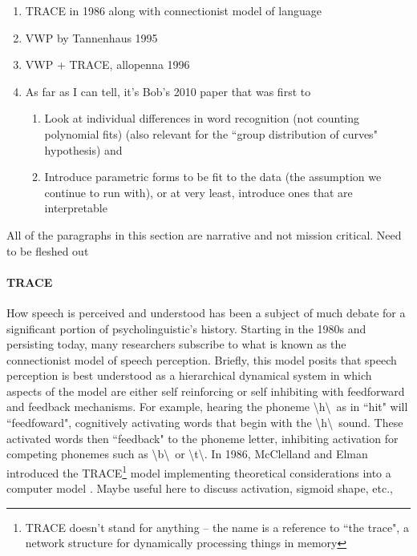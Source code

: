 \documentclass{article}
\begin{document}
\begin{singlespace}
\begin{enumerate}
\vspace{-2mm}
\item TRACE in 1986 along with connectionist model of language
\item VWP by Tannenhaus 1995
\item VWP + TRACE, allopenna 1996
\item As far as I can tell, it's Bob's 2010 paper that was first to 
\begin{enumerate}
\item Look at individual differences in word recognition (not counting polynomial fits) (also relevant for the ``group distribution of curves" hypothesis) and
\item Introduce parametric forms to be fit to the data (the assumption we continue to run with), or at very least, introduce ones that are interpretable
\end{enumerate}
\end{enumerate}
\end{singlespace}

All of the paragraphs in this section are narrative and not mission critical. Need to be fleshed out

\paragraph{TRACE } How speech is perceived and understood has been a subject of much debate for a significant portion of psycholinguistic's history. Starting in the 1980s and persisting today, many researchers subscribe to what is known as the connectionist model of speech perception. Briefly, this model posits that speech perception is best understood as a hierarchical dynamical system in which aspects of the model are either self reinforcing or self inhibiting with feedforward and feedback mechanisms. For example, hearing the phoneme \textbackslash h\textbackslash  \ as in ``hit" will ``feedfoward", cognitively activating words that begin with the \textbackslash h\textbackslash \  sound. These activated words then ``feedback" to the phoneme letter, inhibiting activation for competing phonemes such as \textbackslash b\textbackslash \ or \textbackslash t\textbackslash. In 1986, McClelland and Elman introduced the TRACE\footnote{TRACE doesn't stand for anything -- the name is a reference to ``the trace", a network structure for dynamically processing things in memory} model implementing theoretical considerations into a computer model \cite{elman1985speech}. Maybe useful here to discuss activation, sigmoid shape, etc., 
\end{document}
